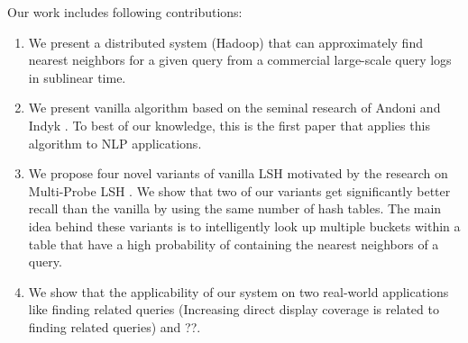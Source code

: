 Our work includes following contributions: 
\begin{enumerate}
\item We present a distributed system (Hadoop) that can approximately find nearest neighbors for a given query from a commercial large-scale query logs in sublinear time. %
\item We present vanilla \lsh algorithm based on the seminal research of Andoni and Indyk  . To best of our knowledge, this is the first paper that applies this algorithm to NLP applications. 
\item We propose four novel variants of vanilla LSH motivated by the research on Multi-Probe LSH \cite{LvVLDB07}.  We show that two of our variants get signiﬁcantly better recall than the vanilla \lsh by using the same number of hash tables. The main idea behind these variants is to intelligently look up multiple buckets within a table that have a high probability of containing the nearest neighbors of a query.  
\item  We show that the applicability of our system on two real-world applications like finding related queries (Increasing  direct display coverage is related to finding related queries) and ??.
\end{enumerate}


